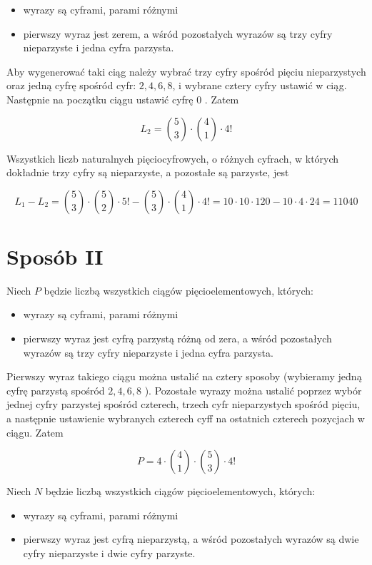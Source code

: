 \documentclass[10pt]{article}
\begin{document}
\begin{itemize}
  \item wyrazy są cyframi, parami różnymi
  \item pierwszy wyraz jest zerem, a wśród pozostałych wyrazów są trzy cyfry nieparzyste i jedna cyfra parzysta.
\end{itemize}

Aby wygenerować taki ciąg należy wybrać trzy cyfry spośród pięciu nieparzystych oraz jedną cyfrę spośród cyfr: $2,4,6,8$, i wybrane cztery cyfry ustawić w ciąg. Następnie na początku ciągu ustawić cyfrę 0 . Zatem

$$
L_{2}=\binom{5}{3} \cdot\binom{4}{1} \cdot 4!
$$

Wszystkich liczb naturalnych pięciocyfrowych, o różnych cyfrach, w których dokładnie trzy cyfry są nieparzyste, a pozostałe są parzyste, jest

$$
L_{1}-L_{2}=\binom{5}{3} \cdot\binom{5}{2} \cdot 5!-\binom{5}{3} \cdot\binom{4}{1} \cdot 4!=10 \cdot 10 \cdot 120-10 \cdot 4 \cdot 24=11040
$$

\section*{Sposób II}
Niech $P$ będzie liczbą wszystkich ciągów pięcioelementowych, których:

\begin{itemize}
  \item wyrazy są cyframi, parami różnymi
  \item pierwszy wyraz jest cyfrą parzystą różną od zera, a wśród pozostałych wyrazów są trzy cyfry nieparzyste i jedna cyfra parzysta.
\end{itemize}

Pierwszy wyraz takiego ciągu można ustalić na cztery sposoby (wybieramy jedną cyfrę parzystą spośród $2,4,6,8$ ). Pozostałe wyrazy można ustalić poprzez wybór jednej cyfry parzystej spośród czterech, trzech cyfr nieparzystych spośród pięciu, a następnie ustawienie wybranych czterech cyff na ostatnich czterech pozycjach w ciągu. Zatem

$$
P=4 \cdot\binom{4}{1} \cdot\binom{5}{3} \cdot 4!
$$

Niech $N$ będzie liczbą wszystkich ciągów pięcioelementowych, których:

\begin{itemize}
  \item wyrazy są cyframi, parami różnymi
  \item pierwszy wyraz jest cyfrą nieparzystą, a wśród pozostałych wyrazów są dwie cyfry nieparzyste i dwie cyfry parzyste.
\end{itemize}
\end{document}
